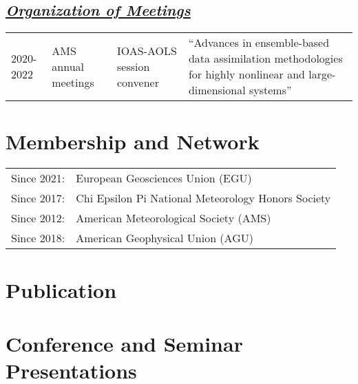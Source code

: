 \documentclass{article}
\newcommand{\cvsection}[1]{\section*{\bfseries#1}}
\newcommand{\cvsubsection}[1]{\subsection*{\itshape\uline{#1}}}
\begin{document}
\cvsubsection{Organization of Meetings}
\begin{tabular}{l p{4cm} p{3cm} p{6cm}}
    2020-2022 & AMS annual meetings & IOAS-AOLS session convener & ``Advances in ensemble-based data assimilation methodologies for highly nonlinear and large-dimensional systems'' \\
\end{tabular}

\cvsection{Membership and Network}
\begin{tabular}{l l}
    Since 2021: & European Geosciences Union (EGU) \\
    Since 2017: & Chi Epsilon Pi National Meteorology Honors Society \\
    Since 2012: & American Meteorological Society (AMS) \\
    Since 2018: & American Geophysical Union (AGU) \\
\end{tabular}


\cvsection{Publication}


\cvsection{Conference and Seminar Presentations}

\end{document}
